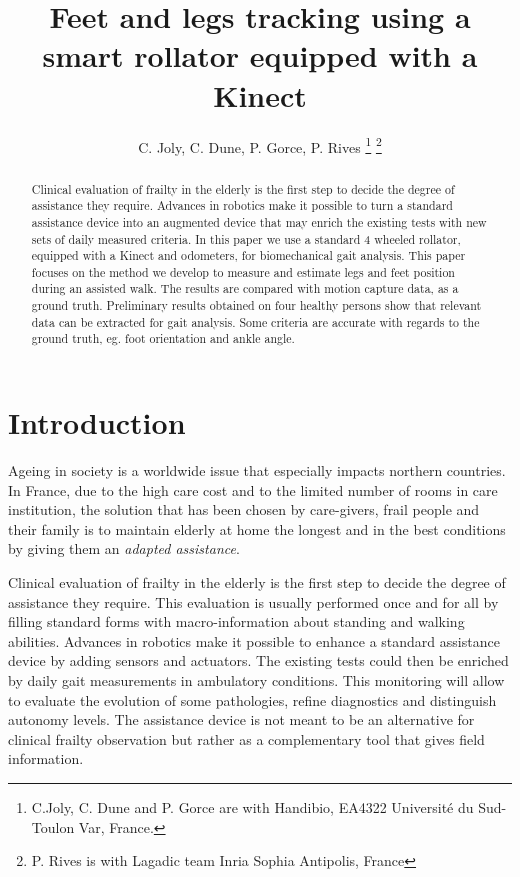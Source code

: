 \documentclass[letterpaper, 10 pt, conference]{ieeeconf}
\title{\LARGE \bf Feet and legs tracking using a smart rollator equipped with a Kinect
 }
\author{
C. Joly, C. Dune,  P. Gorce, P. Rives
\thanks{C.Joly, C. Dune and P. Gorce are with
Handibio, EA4322 Université du Sud- Toulon Var, France. 
}
\thanks{P. Rives is
 with Lagadic team Inria Sophia Antipolis, France}
}
\newcommand{\CJ}[2]{\textcolor{red}{#1}} %
\begin{document}
\maketitle
\thispagestyle{empty}
\pagestyle{empty}


\begin{abstract}
Clinical evaluation of frailty in the elderly is the first step to decide the degree of assistance they require. Advances in robotics make it possible to turn a standard assistance device into an augmented device that may enrich the existing tests with new sets of daily measured criteria. In this paper we use a standard 4 wheeled rollator, equipped with a Kinect and odometers, for biomechanical gait analysis. This paper focuses on the method we develop to measure and estimate legs and feet position during an assisted walk. The results are compared with motion capture data, as a ground truth. Preliminary results obtained on four healthy persons show that relevant data can be extracted for gait analysis. Some criteria are accurate with regards to the ground truth, eg. foot orientation and ankle angle.
\end{abstract}

\section{Introduction}

Ageing in society is a worldwide issue that especially impacts northern countries. In France, due to the high care cost and to the limited number of rooms in care institution, the solution that has been chosen by care-givers, frail people and their family is to maintain elderly at home the longest and in the best conditions by giving them an\textit{ adapted assistance}. \CJ{}{ \\}

Clinical evaluation of frailty in the elderly is the first step to decide the degree of assistance they require. This evaluation is usually performed once and for all by filling standard forms with macro-information about standing and walking abilities. Advances in robotics make it possible to enhance a standard assistance device by adding sensors and actuators. The existing tests could  then be enriched by daily gait measurements in ambulatory conditions. This monitoring will allow to evaluate the evolution of some pathologies, refine diagnostics and distinguish autonomy levels. The assistance device is not meant to be an alternative for clinical frailty observation but rather as a complementary tool that gives field information. %
\end{document}
